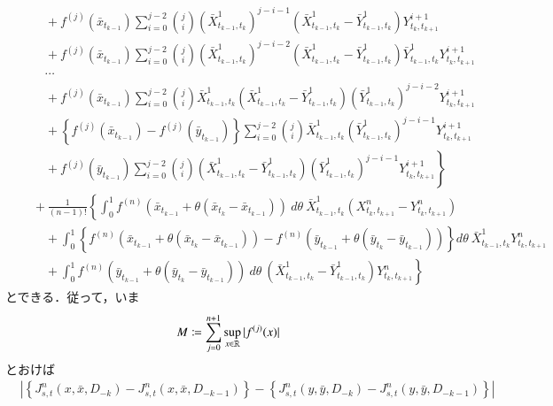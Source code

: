 \begin{prf}
\begin{description}
\begin{align}
							&\qquad + f^{(j)}(\bar{x}_{t_{k-1}}) \sum_{i=0}^{j-2} \binom{j}{i} \left( \bar{X}^1_{t_{k-1},t_k} \right)^{j-i-1} \left( \bar{X}^1_{t_{k-1},t_k} - \bar{Y}^1_{t_{k-1},t_k} \right) Y^{i+1}_{t_k,t_{k+1}} \\
							&\qquad + f^{(j)}(\bar{x}_{t_{k-1}}) \sum_{i=0}^{j-2} \binom{j}{i} \left( \bar{X}^1_{t_{k-1},t_k} \right)^{j-i-2} \left( \bar{X}^1_{t_{k-1},t_k} - \bar{Y}^1_{t_{k-1},t_k} \right) \bar{Y}^1_{t_{k-1},t_k} Y^{i+1}_{t_k,t_{k+1}} \\
							&\qquad \cdots \\
							&\qquad + f^{(j)}(\bar{x}_{t_{k-1}}) \sum_{i=0}^{j-2} \binom{j}{i} \bar{X}^1_{t_{k-1},t_k} \left( \bar{X}^1_{t_{k-1},t_k} - \bar{Y}^1_{t_{k-1},t_k} \right) \left( \bar{Y}^1_{t_{k-1},t_k} \right)^{j-i-2} Y^{i+1}_{t_k,t_{k+1}} \\
							&\qquad + \left\{ f^{(j)}(\bar{x}_{t_{k-1}}) - f^{(j)}(\bar{y}_{t_{k-1}}) \right\} \sum_{i=0}^{j-2} \binom{j}{i} \bar{X}^1_{t_{k-1},t_k} \left( \bar{Y}^1_{t_{k-1},t_k} \right)^{j-i-1} Y^{i+1}_{t_k,t_{k+1}} \\
							&\qquad + \left. f^{(j)}(\bar{y}_{t_{k-1}}) \sum_{i=0}^{j-2} \binom{j}{i} \left( \bar{X}^1_{t_{k-1},t_k} - \bar{Y}^1_{t_{k-1},t_k} \right) \left( \bar{Y}^1_{t_{k-1},t_k} \right)^{j-i-1} Y^{i+1}_{t_k,t_{k+1}} \right\} \\
						&\quad + \frac{1}{(n-1)!} \left\{ \int_0^1 f^{(n)}(\bar{x}_{t_{k-1}} + \theta(\bar{x}_{t_k}-\bar{x}_{t_{k-1}}))\ d\theta\ \bar{X}^1_{t_{k-1},t_k} \left( X^{n}_{t_k,t_{k+1}} - Y^{n}_{t_k,t_{k+1}} \right) \right. \\
							&\qquad + \int_0^1 \left\{ f^{(n)}(\bar{x}_{t_{k-1}} + \theta(\bar{x}_{t_k}-\bar{x}_{t_{k-1}})) - f^{(n)}(\bar{y}_{t_{k-1}} + \theta(\bar{y}_{t_k}-\bar{y}_{t_{k-1}})) \right\} d\theta\ \bar{X}^1_{t_{k-1},t_k} Y^{n}_{t_k,t_{k+1}} \\
							&\qquad + \left. \int_0^1 f^{(n)}(\bar{y}_{t_{k-1}} + \theta(\bar{y}_{t_k}-\bar{y}_{t_{k-1}}))\ d\theta\ \left( \bar{X}^1_{t_{k-1},t_k} - \bar{Y}^1_{t_{k-1},t_k} \right) Y^{n}_{t_k,t_{k+1}} \right\}
				\end{align}
				とできる．従って，いま
				\begin{align}
					M \coloneqq \sum_{j=0}^{n+1}\operatorname*{sup}_{x \in \mathbb{R}} |f^{(j)}(x)|
				\end{align}
				とおけば
				\begin{align}
					&\left| \left\{J^n_{s,t}(x,\bar{x},D_{-k}) - J^n_{s,t}(x,\bar{x},D_{-k-1})\right\} - \left\{J^n_{s,t}(y,\bar{y},D_{-k}) - J^n_{s,t}(y,\bar{y},D_{-k-1})\right\} \right| \\

\end{align}
\end{description}
\end{prf}
